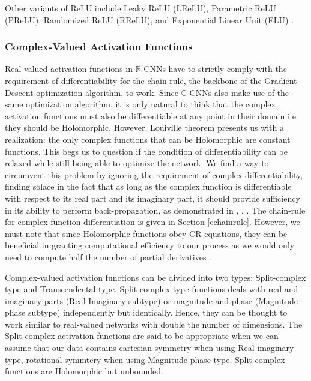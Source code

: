  
 Other variants of ReLU include Leaky ReLU (LReLU), Parametric ReLU (PReLU), Randomized ReLU (RReLU), and Exponential Linear Unit (ELU) \cite{recent_advances}. 
  

  
 \subsubsection{Complex-Valued Activation Functions}\label{cvaf}
 
 Real-valued activation functions in $\mathbb{R}$-CNNs have to strictly comply with the requirement of differentiability for the chain rule, the backbone of the Gradient Descent optimization algorithm, to work. Since $\mathbb{C}$-CNNs also make use of the 
 same optimization algorithm, it is only natural to think that the complex activation functions must also be differentiable at any point in their domain i.e. they should be Holomorphic. However, Louiville theorem presents us with a realization: the only complex functions that can be  Holomorphic are constant functions. This begs us to question if the condition of differentiability can be relaxed while still being able to optimize the network.
 We find a way to circumvent this problem by ignoring the requirement of complex differentiability, finding solace in the fact that as long as the complex function is differentiable with respect to its real part and its imaginary part, it should provide sufficiency in its ability to perform back-propagation, as demonstrated in \cite{trabelsi2018deep}, \cite{hansch2010complex}, \cite{polsarzhang2017complex}. The chain-rule for complex function differentiation is given in Section \ref{cchainrule}. However, we must note that since Holomorphic functions obey CR equations, they can be  beneficial in granting computational efficiency to our process as we would only need to compute half the number of partial derivatives \cite{sarroff2015learning}.
 
     
 Complex-valued activation functions can be divided into two types: Split-complex type and Transcendental type.
 Split-complex type functions deals with real and imaginary parts (Real-Imaginary subtype) or magnitude and phase (Magnitude-phase subtype) independently but identically. Hence, they can be thought to work similar to real-valued networks with double the number of dimensions. The Split-complex activation functions are said to be appropriate when we can assume that our data contains cartesian symmetry when using Real-imaginary type, rotational symmtery when using Magnitude-phase type. Split-complex functions are Holomorphic but unbounded.
 

